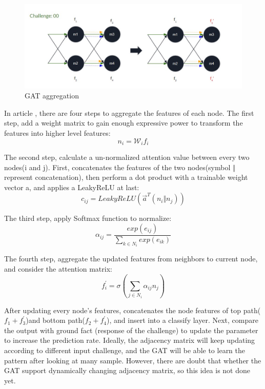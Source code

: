 \begin{figure}[htp]
    \centering
    \includegraphics[width=12cm]{figures/figure12.jpg}
    \caption{GAT aggregation}
    \label{fig:figure12}
    \end{figure}

In article \cite{Reference10}, there are four steps to aggregate the features of each node. The first step, add a weight matrix to gain enough expressive power to transform the features into higher level features:
\begin{equation}
    n_i = \mathcal{W}_if_i
\end{equation}

The second step, calculate a un-normalized attention value between every two nodes(i and j). First, concatenates the features of the two nodes(symbol $\Vert$ represent concatenation), then perform a dot product
with a trainable weight vector a, and applies a LeakyReLU at last:
\begin{equation}
    c_{ij} = LeakyReLU(\overrightarrow{a}^T(n_i \Vert n_j))
\end{equation}

The third step, apply Softmax function to normalize:
\begin{equation}
    \alpha_{ij} = \frac{exp(e_{ij})}{\sum_{k \in N_i}  exp(e_{ik})} 
\end{equation}

The fourth step, aggregate the updated features from neighbors to current node, and consider the attention matrix:
\begin{equation}
    f_i^{'} = \sigma (\sum_{j \in N_i} \alpha_{ij}n_j)
\end{equation}


After updating every node's features, concatenates the node features of top path($f_1+f_3^{'}$)and bottom path($f_2+f_4^{'}$), and insert into a classify layer. Next, compare the output with ground fact
(response of the challenge) to update the parameter to increase the prediction rate. Ideally, the adjacency matrix will keep updating according to different input challenge, and the GAT will be able to 
learn the pattern after looking at many sample. However, there are doubt that whether the GAT support dynamically changing adjacency matrix, so this idea is not done yet.



